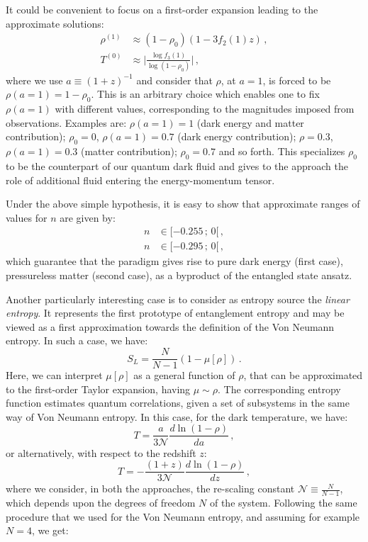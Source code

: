 \documentclass[nofootinbib,prd,superscriptaddress,showpacs,showkeys,]{revtex4}
\begin{document}
It could be convenient to focus on a first-order expansion leading to the approximate solutions:
\begin{subequations}\label{appr}
\begin{align}
\rho^{(1)}&\approx (1-\rho_0)(1-3f_2(1)z)\,,\\
T^{(0)}&\approx\Big|\frac{\log f_3(1)}{\log(1-\rho_0)}\Big|\,,
\end{align}
\end{subequations}
where we use  $a\equiv(1+z)^{-1}$ and  consider that $\rho$, at $a=1$, is forced to be $\rho(a=1)=1-\rho_0$. This is an arbitrary choice which enables one to fix $\rho(a=1)$ with different values, corresponding to the magnitudes imposed from observations. Examples are: $\rho(a=1)=1$ (dark energy and  matter contribution); $\rho_0=0$, $\rho(a=1)=0.7$ (dark energy contribution); $\rho=0.3$, $\rho(a=1)=0.3$ (matter contribution);  $\rho_0=0.7$ and so forth. This specializes $\rho_0$ to be the counterpart of our quantum dark fluid and gives to the approach the role of additional fluid entering the  energy-momentum tensor.

Under the above simple hypothesis, it is easy to show that  approximate ranges of values for $n$ are given by:
\begin{subequations}\label{enne}
\begin{align}
n&\in[-0.255\,;\,0[\,,\\
n&\in[-0.295\,;\,0[\,,
\end{align}
\end{subequations}
which guarantee that the paradigm gives rise to  pure dark energy (first case),  pressureless matter (second case), as a byproduct of the entangled state ansatz.

Another particularly interesting case is to consider as entropy source the \emph{linear entropy}. It represents the first prototype of entanglement entropy and may be viewed as a first approximation towards the definition of the Von Neumann entropy. In such a case, we have:
\begin{equation}\label{linearentropy}
S_L=\frac{N}{N-1}\left(1-\mu\left[\rho\right]\right)\,.
\end{equation}
Here, we can interpret $\mu[\rho]$ as a general function of $\rho$, that can be approximated to the first-order Taylor expansion, having $\mu\sim\rho$. The corresponding entropy function estimates quantum correlations, given a set of subsystems in the same way of Von Neumann entropy.
In this case, for the dark temperature, we  have:
\begin{equation}\label{temp}
T=\frac{a}{3\mathcal N}\frac{d\ln(1-\rho)}{da}\,,
\end{equation}
or alternatively, with respect to the redshift $z$:
\begin{equation}\label{tempz}
T=-\frac{(1+z)}{3\mathcal N}\frac{d\ln(1-\rho)}{dz}\,,
\end{equation}
where we consider, in both the approaches, the re-scaling constant $\mathcal N\equiv \frac{N}{N-1}$, which depends upon the degrees of freedom $N$ of the system. Following the same procedure that we used for the Von Neumann entropy, and assuming for example $N=4$, we  get:
\end{document}
